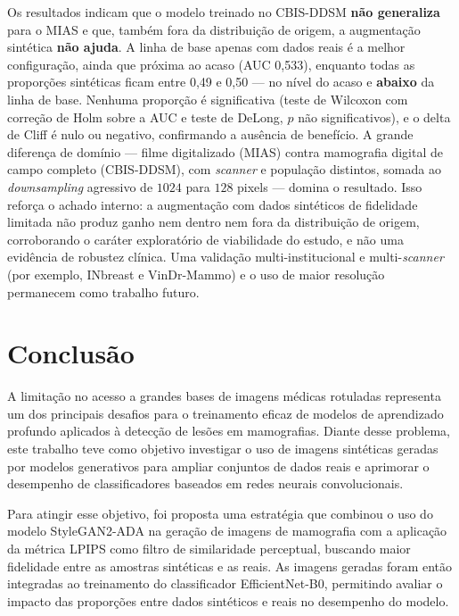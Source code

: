 \documentclass[
	12pt,				%
	openright,			%
	oneside,			%
	a4paper,			%
	tcc,			%
	]{ABNT-DC-UEL}
\begin{document}
Os resultados indicam que o modelo treinado no CBIS-DDSM \textbf{não generaliza} para o MIAS e que, também fora da distribuição de origem, a augmentação sintética \textbf{não ajuda}. A linha de base apenas com dados reais é a melhor configuração, ainda que próxima ao acaso (AUC 0,533), enquanto todas as proporções sintéticas ficam entre 0,49 e 0,50 — no nível do acaso e \textbf{abaixo} da linha de base. Nenhuma proporção é significativa (teste de Wilcoxon com correção de Holm sobre a AUC e teste de DeLong, $p$ não significativos), e o delta de Cliff é nulo ou negativo, confirmando a ausência de benefício. A grande diferença de domínio — filme digitalizado (MIAS) contra mamografia digital de campo completo (CBIS-DDSM), com \textit{scanner} e população distintos, somada ao \textit{downsampling} agressivo de $1024$ para $128$ pixels — domina o resultado. Isso reforça o achado interno: a augmentação com dados sintéticos de fidelidade limitada não produz ganho nem dentro nem fora da distribuição de origem, corroborando o caráter exploratório de viabilidade do estudo, e não uma evidência de robustez clínica. Uma validação multi-institucional e multi-\textit{scanner} (por exemplo, INbreast e VinDr-Mammo) e o uso de maior resolução permanecem como trabalho futuro.

\chapter{Conclusão}

A limitação no acesso a grandes bases de imagens médicas rotuladas representa um dos principais desafios para o treinamento eficaz de modelos de aprendizado profundo aplicados à detecção de lesões em mamografias. Diante desse problema, este trabalho teve como objetivo investigar o uso de imagens sintéticas geradas por modelos generativos para ampliar conjuntos de dados reais e aprimorar o desempenho de classificadores baseados em redes neurais convolucionais.

Para atingir esse objetivo, foi proposta uma estratégia que combinou o uso do modelo StyleGAN2-ADA na geração de imagens de mamografia com a aplicação da métrica LPIPS como filtro de similaridade perceptual, buscando maior fidelidade entre as amostras sintéticas e as reais. As imagens geradas foram então integradas ao treinamento do classificador EfficientNet-B0, permitindo avaliar o impacto das proporções entre dados sintéticos e reais no desempenho do modelo.
\end{document}
